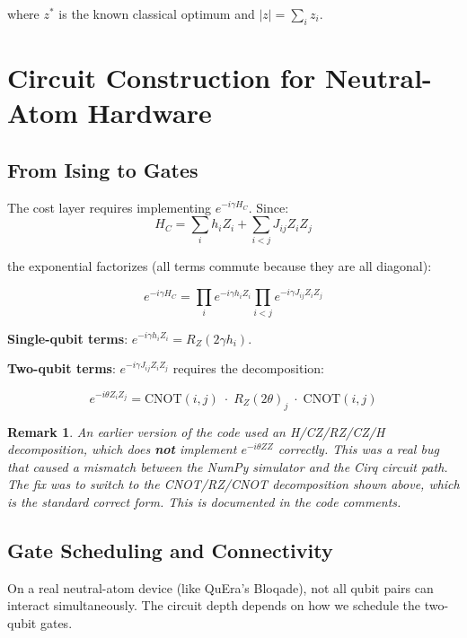 \documentclass[12pt, a4paper]{article}
\newtheorem{remark}{Remark}[section]
\begin{document}
where $z^*$ is the known classical optimum and $|z| = \sum_i z_i$.


\section{Circuit Construction for Neutral-Atom Hardware}

\subsection{From Ising to Gates}

The cost layer requires implementing $e^{-i \gamma H_C}$. Since:
\[
H_C = \sum_i h_i Z_i + \sum_{i<j} J_{ij} Z_i Z_j
\]

the exponential factorizes (all terms commute because they are all diagonal):

\[
e^{-i \gamma H_C} = \prod_i e^{-i \gamma h_i Z_i}
                     \prod_{i<j} e^{-i \gamma J_{ij} Z_i Z_j}
\]

\textbf{Single-qubit terms}: $e^{-i \gamma h_i Z_i} = R_Z(2\gamma h_i)$.

\textbf{Two-qubit terms}: $e^{-i \gamma J_{ij} Z_i Z_j}$ requires the
decomposition:

\begin{equation}
e^{-i \theta Z_i Z_j} = \text{CNOT}(i,j) \;\cdot\; R_Z(2\theta)_j \;\cdot\; \text{CNOT}(i,j)
\label{eq:zz_decomp}
\end{equation}

\begin{remark}
An earlier version of the code used an H/CZ/RZ/CZ/H decomposition, which does
\textbf{not} implement $e^{-i\theta ZZ}$ correctly. This was a real bug that
caused a mismatch between the NumPy simulator and the Cirq circuit path. The
fix was to switch to the CNOT/RZ/CNOT decomposition shown above, which is the
standard correct form. This is documented in the code comments.
\end{remark}

\subsection{Gate Scheduling and Connectivity}

On a real neutral-atom device (like QuEra's Bloqade), not all qubit pairs can
interact simultaneously. The circuit depth depends on how we schedule the
two-qubit gates.
\end{document}

